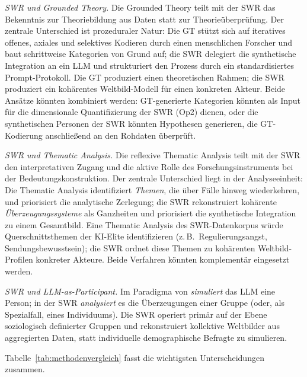 \documentclass[11pt,a4paper]{article}
\theoremstyle{definition}
\theoremstyle{plain}
\theoremstyle{remark}
\begin{document}
\emph{SWR und Grounded Theory.} Die Grounded Theory \citep{GlaserStrauss1967, Saldana2021} teilt mit der SWR das Bekenntnis zur Theoriebildung aus Daten statt zur Theorie\"uberpr\"ufung. Der zentrale Unterschied ist prozeduraler Natur: Die GT st\"utzt sich auf iteratives offenes, axiales und selektives Kodieren durch einen menschlichen Forscher und baut schrittweise Kategorien von Grund auf; die SWR delegiert die synthetische Integration an ein LLM und strukturiert den Prozess durch ein standardisiertes Prompt-Protokoll. Die GT produziert einen theoretischen Rahmen; die SWR produziert ein koh\"arentes Weltbild-Modell f\"ur einen konkreten Akteur. Beide Ans\"atze k\"onnten kombiniert werden: GT-generierte Kategorien k\"onnten als Input f\"ur die dimensionale Quantifizierung der SWR (Op2) dienen, oder die synthetischen Personen der SWR k\"onnten Hypothesen generieren, die GT-Kodierung anschlie\ss{}end an den Rohdaten \"uberpr\"uft.

\emph{SWR und Thematic Analysis.} Die reflexive Thematic Analysis \citep{BraunClarke2006} teilt mit der SWR den interpretativen Zugang und die aktive Rolle des Forschungsinstruments bei der Bedeutungskonstruktion. Der zentrale Unterschied liegt in der Analyseeinheit: Die Thematic Analysis identifiziert \emph{Themen}, die \"uber F\"alle hinweg wiederkehren, und priorisiert die analytische Zerlegung; die SWR rekonstruiert koh\"arente \emph{\"Uberzeugungssysteme} als Ganzheiten und priorisiert die synthetische Integration zu einem Gesamtbild. Eine Thematic Analysis des SWR-Datenkorpus w\"urde Querschnittsthemen der KI-Elite identifizieren (z.\,B.\ \glqq Regulierungsangst\grqq, \glqq Sendungsbewusstsein\grqq); die SWR ordnet diese Themen zu koh\"arenten Weltbild-Profilen konkreter Akteure. Beide Verfahren k\"onnten komplement\"ar eingesetzt werden.

\emph{SWR und LLM-as-Participant.} Im Paradigma von \citet{Argyle2023} \emph{simuliert} das LLM eine Person; in der SWR \emph{analysiert} es die \"Uberzeugungen einer Gruppe (oder, als Spezialfall, eines Individuums). Die SWR operiert prim\"ar auf der Ebene soziologisch definierter Gruppen und rekonstruiert kollektive Weltbilder aus aggregierten Daten, statt individuelle demographische Befragte zu simulieren.

Tabelle~\ref{tab:methodenvergleich} fasst die wichtigsten Unterscheidungen zusammen.
\end{document}
